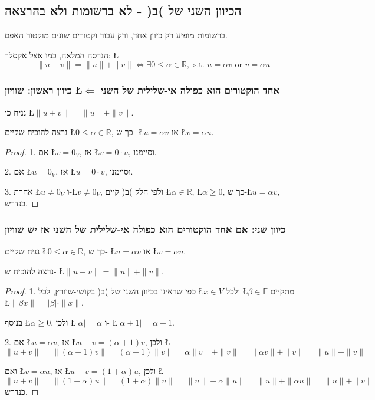 \documentclass[english,hebrew]{article}
\begin{document}
\subsection{הכיוון השני של )ב( - לא ברשומות ולא בהרצאה}

ברשומות מופיע רק כיוון אחד, ורק עבור וקטורים שונים מוקטור האפס.

הגרסה המלאה, כמו אצל אקסלר: \L{%
\[
\|u+v\|=\|u\|+\|v\|\iff\exists0\le\alpha\in\mathbb{R},\text{ s.t. }u=\alpha v\text{ or }v=\alpha u
\]
}%

\subsubsection{כיוון ראשון: שוויון \L{$\Leftarrow$} אחד הוקטורים הוא כפולה אי-שלילית
של השני}

נניח כי \L{$\|u+v\|=\|u\|+\|v\|$}.

נרצה להוכיח שקיים \L{$0\le\alpha\in\mathbb{R}$}, כך ש- \L{$u=\alpha v$}
או \L{$v=\alpha u$}.
\begin{proof}
1. אם \L{$v=0_{V}$}, אז \L{$v=0\cdot u$}, וסיימנו.

2. אם \L{$u=0_{V}$}, אז \L{$u=0\cdot v$}, וסיימנו.

3. אחרת \L{$u\neq0_{V}$} ו-\L{$v\neq0_{V}$}, ולפי חלק )ב( קיים \L{$\alpha\in\mathbb{R}$},
\L{$\alpha\geq0$}, כך ש-\L{$u=\alpha v$}, כנדרש. 
\end{proof}

\subsubsection{כיוון שני: אם אחד הוקטורים הוא כפולה אי-שלילית של השני אז יש שוויון}

נניח שקיים \L{$0\le\alpha\in\mathbb{R}$}, כך ש- \L{$u=\alpha v$}
או \L{$v=\alpha u$}.

נרצה להוכיח ש- \L{$\|u+v\|=\|u\|+\|v\|$}.
\begin{proof}
1. כפי שראינו בכיוון השני של )ב( בקושי-שוורץ, לכל \L{$x\in V$} ולכל
\L{$\beta\in\mathbb{F}$} מתקיים \L{$\|\beta x\|=|\beta|\cdot\|x\|$}.

בנוסף \L{$\alpha\geq0$}, ולכן \L{$|\alpha|=\alpha$} ו- \L{$|\alpha+1|=\alpha+1$}.

2. אם \L{$u=\alpha v$}, אז \L{$u+v=(\alpha+1)v$}, ולכן \L{%
\[
\|u+v\|=\|(\alpha+1)v\|=(\alpha+1)\|v\|=\alpha\|v\|+\|v\|=\|\alpha v\|+\|v\|=\|u\|+\|v\|
\]
}%

ואם \L{$v=\alpha u$}, אז \L{$u+v=(1+\alpha)u$}, ולכן \L{%
\[
\|u+v\|=\|(1+\alpha)u\|=(1+\alpha)\|u\|=\|u\|+\alpha\|u\|=\|u\|+\|\alpha u\|=\|u\|+\|v\|
\]
}%
כנדרש. 
\end{proof}
\end{document}

